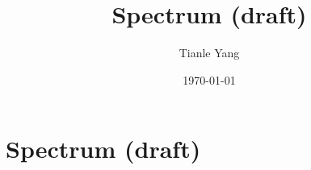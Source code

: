 \documentclass{noteformyself}
\title{Spectrum (draft)}
\author{Tianle Yang}
\date{\today}
\begin{document}
    \maketitle

    \section{Spectrum (draft)}



\end{document}
